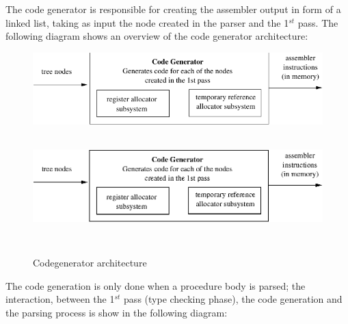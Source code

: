\documentclass [a4paper,12pt]{article}
\begin{document}
The code generator is responsible for creating the assembler output in form
of a linked list, taking as input the node created in the parser and the
1$^{st}$ pass. The following diagram shows an overview of the code generator
architecture:

\begin{figure}
\ifpdf
\includegraphics{arch9.pdf}
\else
\includegraphics[width=5.68in,height=1.76in]{arch9.eps}
\fi
\label{fig9}
\caption{Codegenerator architecture}
\end{figure}

The code generation is only done when a procedure body is parsed; the
interaction, between the 1$^{st}$ pass (type checking phase), the code
generation and the parsing process is show in the following diagram:
\end{document}
